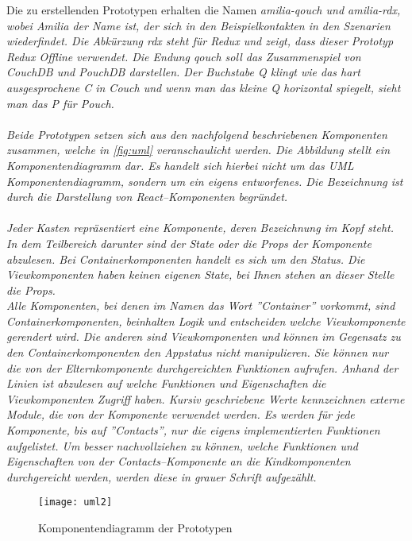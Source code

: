 Die zu erstellenden Prototypen erhalten die Namen \it{amilia-qouch} und \it{amilia-rdx}, wobei Amilia der Name ist, der sich in den Beispielkontakten in den Szenarien wiederfindet.
Die Abkürzung \it{rdx} steht für Redux und zeigt, dass dieser Prototyp Redux Offline verwendet.
Die Endung \it{qouch} soll das Zusammenspiel von CouchDB und PouchDB darstellen. Der Buchstabe Q klingt wie das hart ausgesprochene C in Couch und wenn man das kleine Q horizontal spiegelt, sieht man das P für Pouch.\\\\
%
%
Beide Prototypen setzen sich aus den nachfolgend beschriebenen Komponenten zusammen, welche in \autoref{fig:uml} veranschaulicht werden.
Die Abbildung stellt ein Komponentendiagramm dar.
Es handelt sich hierbei nicht um das UML Komponentendiagramm, sondern um ein eigens entworfenes.
Die Bezeichnung ist durch die Darstellung von React--Komponenten begründet.\\\\
%
%
Jeder Kasten repräsentiert eine Komponente, deren Bezeichnung im Kopf steht.
In dem Teilbereich darunter sind der State oder die Props der Komponente abzulesen. Bei Containerkomponenten handelt es sich um den Status. Die Viewkomponenten haben keinen eigenen State, bei Ihnen stehen an dieser Stelle die Props.\\
Alle Komponenten, bei denen im Namen das Wort ''Container'' vorkommt, sind Containerkomponenten, beinhalten Logik und entscheiden welche Viewkomponente gerendert wird.
Die anderen sind Viewkomponenten und können im Gegensatz zu den Containerkomponenten den Appstatus nicht manipulieren.
Sie können nur die von der Elternkomponente durchgereichten Funktionen aufrufen.
Anhand der Linien ist abzulesen auf welche Funktionen und Eigenschaften die Viewkomponenten Zugriff haben.
Kursiv geschriebene Werte kennzeichnen externe Module, die von der Komponente verwendet werden.
Es werden für jede Komponente, bis auf ''Contacts'', nur die eigens implementierten Funktionen aufgelistet. Um besser nachvollziehen zu können, welche Funktionen und Eigenschaften von der Contacts--Komponente an die Kindkomponenten durchgereicht werden, werden diese in grauer Schrift aufgezählt.
%
\begin{figure}[H]
  \centering
  \texttt{[image: uml2]}
  \grayRule
  \caption[Komponentendiagramm]{Komponentendiagramm der Prototypen}
  \label{fig:uml}
\end{figure}

